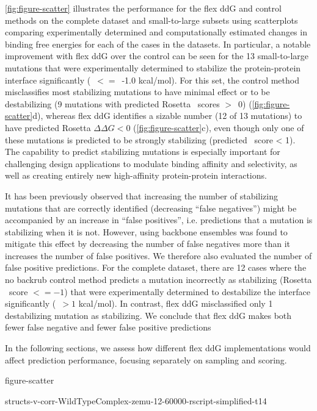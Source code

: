 \cref{fig:figure-scatter} illustrates the performance for the flex ddG and control methods on the complete dataset and small-to-large subsets using scatterplots comparing experimentally determined and computationally estimated changes in binding free energies for each of the cases in the datasets. In particular, a notable improvement with flex ddG over the control can be seen for the 13 small-to-large mutations that were experimentally determined to stabilize the protein-protein interface significantly (\ddg\ $<=$\ -1.0 kcal/mol). For this set, the control method misclassifies most stabilizing mutations to have minimal effect or to be destabilizing (9 mutations with predicted Rosetta \ddg\ scores $>$\ 0) (\cref{fig:figure-scatter}d), whereas flex ddG identifies a sizable number (12 of 13 mutations) to have predicted Rosetta $\Delta\Delta G < 0$ (\cref{fig:figure-scatter}c), even though only one of these mutations is predicted to be strongly stabilizing (predicted \ddg\ score < 1). The capability to predict stabilizing mutations is especially important for challenging design applications to modulate binding affinity and selectivity, as well as creating entirely new high-affinity protein-protein interactions.

It has been previously observed that increasing the number of stabilizing mutations that are correctly identified (decreasing ``false negatives'') might be accompanied by an increase in ``false positives'', i.e. predictions that a mutation is stabilizing when it is not. However, using backbone ensembles was found to mitigate this effect by decreasing the number of false negatives more than it increases the number of false positives\cite{davey_improving_2014}. We therefore also evaluated the number of false positive predictions. For the complete dataset, there are 12 cases where the no backrub control method predicts a mutation incorrectly as stabilizing (Rosetta \ddg\ score $<= -1$) that were experimentally determined to destabilize the interface significantly (\ddg\ $> 1$ kcal/mol). In contrast, flex ddG misclassified only 1 destabilizing mutation as stabilizing. We conclude that flex ddG makes both fewer false negative and fewer false positive predictions

In the following sections, we assess how different flex ddG implementations would affect prediction performance, focusing separately on sampling and scoring.

{figure-scatter}

{structs-v-corr-WildTypeComplex-zemu-12-60000-rscript-simplified-t14}

